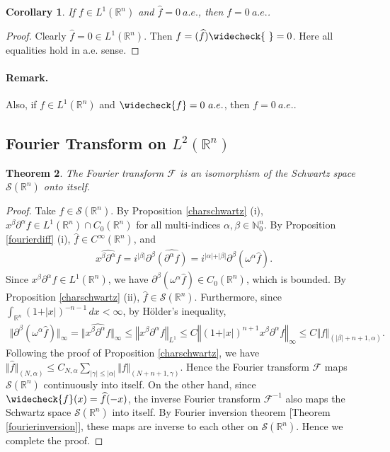 \documentclass{article}
\numberwithin{equation}{section}
\newcommand{\bbN}{\mathbb{N}}
\newcommand{\bbR}{\mathbb{R}}
\renewcommand{\cal}{\mathcal}
\newcommand{\wh}{\widehat}
\theoremstyle{plain}
\newtheorem{theorem}{Theorem}[section]
\newtheorem{corollary}[theorem]{Corollary}
\theoremstyle{definition}
\begin{document}
\begin{corollary}\label{fourierker}
If $f\in L^1(\bbR^n)$ and $\wh{f}=0\ a.e.$, then $f=0\ a.e.$.
\end{corollary}
\begin{proof}
Clearly $\wh{f}=0\in L^1(\bbR^n)$. Then $f=(\wh{f})\widecheck{\ }=0$. Here all equalities hold in a.e. sense.
\end{proof}

\paragraph{Remark.} Also, if $f\in L^1(\bbR^n)$ and $\widecheck{f}=0\ a.e.$, then $f=0\ a.e.$.

\subsection{Fourier Transform on $L^2(\bbR^n)$}
\begin{theorem}
The Fourier transform $\cal{F}$ is an isomorphism of the Schwartz space $\cal{S}(\bbR^n)$ onto itself.
\end{theorem}
\begin{proof}
Take $f\in\cal{S}(\bbR^n)$. By Proposition \ref{charschwartz} (i), $x^\beta\partial^\alpha f\in L^1(\bbR^n)\cap C_0(\bbR^n)$ for all multi-indices $\alpha,\beta\in\bbN_0^n$. By Proposition \ref{fourierdiff} (i), $\wh{f}\in C^\infty(\bbR^n)$, and
\begin{align*}
	\wh{x^\beta\partial^\alpha f}=i^{\vert\beta\vert}\partial^\beta\wh{(\partial^{\alpha}f)}=i^{\vert\alpha\vert+\vert\beta\vert}\partial^\beta(\omega^{\alpha}\wh{f}).
\end{align*}
Since $x^\beta\partial^\alpha f\in L^1(\bbR^n)$, we have $\partial^\beta(\omega^{\alpha}\wh{f})\in C_0(\bbR^n)$, which is bounded. By Proposition \ref{charschwartz} (ii), $\wh{f}\in\cal{S}(\bbR^n)$. Furthermore, since $\int_{\bbR^n}(1+\vert x\vert)^{-n-1}\,dx<\infty$, by 
Hölder's inequality,
\begin{align*}
	\bigl\Vert\partial^\beta(\omega^\alpha\wh{ f})\bigr\Vert_\infty=\bigl\Vert\wh{x^\beta\partial^\alpha f}\bigr\Vert_\infty\leq\left\Vert x^\beta\partial^\alpha f\right\Vert_{L^1}\leq C\left\Vert(1+\vert x\vert)^{n+1}x^\beta\partial^\alpha f\right\Vert_{\infty}\leq C\Vert f\Vert_{(\vert\beta\vert+n+1,\alpha)}.
\end{align*}
Following the proof of Proposition \ref{charschwartz}, we have $\Vert\wh{f}\Vert_{(N,\alpha)}\leq C_{N,\alpha}\sum_{\vert\gamma\vert\leq\vert\alpha\vert}\Vert f\Vert_{(N+n+1,\gamma)}$. Hence the Fourier transform $\cal{F}$ maps $\cal{S}(\bbR^n)$ continuously into itself. On the other hand, since $\widecheck{f}(x)=\wh{f}(-x)$, the inverse Fourier transform $\cal{F}^{-1}$ also maps the Schwartz space $\cal{S}(\bbR^n)$ into itself. By Fourier inversion theorem [Theorem \ref{fourierinversion}], these maps are inverse to each other on $\cal{S}(\bbR^n)$. Hence we complete the proof.
\end{proof}
\end{document}
